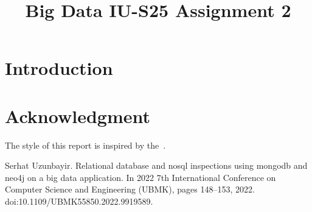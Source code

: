 \documentclass[conference]{IEEEtran}
\begin{document}
\title{Big Data IU-S25 Assignment 2}

\author{
}

\maketitle

\begin{abstract}
    \lipsum[1]
\end{abstract}


\section{Introduction}
\lipsum[2]

\section*{Acknowledgment}

The style of this report is inspired by the~\cite{uzunbayir}.



\begin{thebibliography}{00}
     Serhat Uzunbayir. Relational database and nosql inspections using mongodb and neo4j on a big data application.
    In 2022 7th International Conference on Computer Science and Engineering (UBMK), pages 148--153, 2022.
    doi:10.1109/UBMK55850.2022.9919589.
\end{thebibliography}
\end{document}
